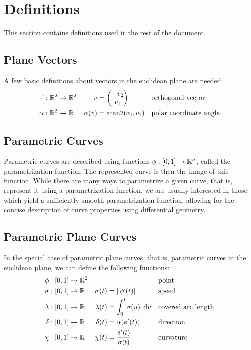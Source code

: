 \documentclass[a4paper]{article}
\begin{document}
	\appendix

	\section{Definitions}
	\label{section:definitions}

		This section contains definitions used in the rest of the document.

		\subsection{Plane Vectors}
		\label{section:plane_vectors}

			A few basic definitions about vectors in the euclidean plane are needed:
			\begin{align*}
				\overline{\cdot} & : \function{\R{2}}{\R{2}} & \overline{v}      & = \vectorB{-v_2}{v_1}      && \text{orthogonal vector}\\
				\alpha           & : \function{\R{2}}{\RR}   & \apply{\alpha}{v} & = \apply{\atan2}{v_2, v_1} && \text{polar coordinate angle}
			\end{align*}

		\subsection{Parametric Curves}
		\label{section:parametric_curves}

			Parametric curves are described using functions \(\phi : \left[ 0,1 \right] \rightarrow \mathbb{R}^{n}\), called the parametrization function. The represented curve is then the image of this function. While there are many ways to parametrize a given curve, that is, represent it using a parametrization function, we are usually interested in those which yield a sufficiently smooth parametrization function, allowing for the concise description of curve properties using differential geometry.

		\subsection{Parametric Plane Curves}
		\label{section:parametric_plane_curves}

			In the special case of parametric plane curves, that is, parametric curves in the euclidean plane, we can define the following functions:
			\begin{align*}
				\phi    & : \function{\unit}{\R{2}} &                    &                                                && \text{point}\\
				\sigma  & : \function{\unit}{\RR}   & \apply{\sigma}{t}  & = \xn{\apply{\phi'}{t}}                        && \text{speed}\\
				\lambda & : \function{\unit}{\RR}   & \apply{\lambda}{t} & = \integral{0}{t}{\apply{\sigma}{u}}{u}        && \text{covered arc length}\\
				\delta  & : \function{\unit}{\RR}   & \apply{\delta}{t}  & = \apply{\alpha}{\apply{\phi'}{t}}             && \text{direction}\\
				\chi    & : \function{\unit}{\RR}   & \apply{\chi}{t}    & = \frac{\apply{\delta'}{t}}{\apply{\sigma}{t}} && \text{curvature}
			\end{align*}
\end{document}
